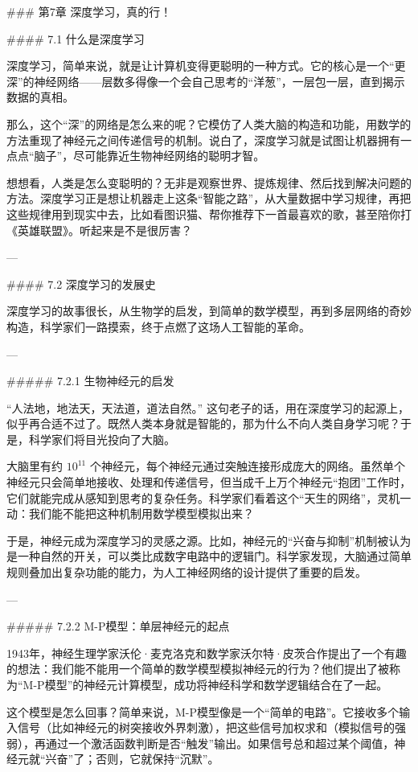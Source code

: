 ### 第7章 深度学习，真的行！

#### 7.1 什么是深度学习

深度学习，简单来说，就是让计算机变得更聪明的一种方式。它的核心是一个“更深”的神经网络——层数多得像一个会自己思考的“洋葱”，一层包一层，直到揭示数据的真相。

那么，这个“深”的网络是怎么来的呢？它模仿了人类大脑的构造和功能，用数学的方法重现了神经元之间传递信号的机制。说白了，深度学习就是试图让机器拥有一点点“脑子”，尽可能靠近生物神经网络的聪明才智。

想想看，人类是怎么变聪明的？无非是观察世界、提炼规律、然后找到解决问题的方法。深度学习正是想让机器走上这条“智能之路”，从大量数据中学习规律，再把这些规律用到现实中去，比如看图识猫、帮你推荐下一首最喜欢的歌，甚至陪你打《英雄联盟》。听起来是不是很厉害？

---

#### 7.2 深度学习的发展史

深度学习的故事很长，从生物学的启发，到简单的数学模型，再到多层网络的奇妙构造，科学家们一路摸索，终于点燃了这场人工智能的革命。

---

##### 7.2.1 生物神经元的启发

“人法地，地法天，天法道，道法自然。” 这句老子的话，用在深度学习的起源上，似乎再合适不过了。既然人类本身就是智能的，那为什么不向人类自身学习呢？于是，科学家们将目光投向了大脑。

大脑里有约 \(10^{11}\) 个神经元，每个神经元通过突触连接形成庞大的网络。虽然单个神经元只会简单地接收、处理和传递信号，但当成千上万个神经元“抱团”工作时，它们就能完成从感知到思考的复杂任务。科学家们看着这个“天生的网络”，灵机一动：我们能不能把这种机制用数学模型模拟出来？

于是，神经元成为深度学习的灵感之源。比如，神经元的“兴奋与抑制”机制被认为是一种自然的开关，可以类比成数字电路中的逻辑门。科学家发现，大脑通过简单规则叠加出复杂功能的能力，为人工神经网络的设计提供了重要的启发。

---

##### 7.2.2 M-P模型：单层神经元的起点

1943年，神经生理学家沃伦·麦克洛克和数学家沃尔特·皮茨合作提出了一个有趣的想法：我们能不能用一个简单的数学模型模拟神经元的行为？他们提出了被称为“M-P模型”的神经元计算模型，成功将神经科学和数学逻辑结合在了一起。

这个模型是怎么回事？简单来说，M-P模型像是一个“简单的电路”。它接收多个输入信号（比如神经元的树突接收外界刺激），把这些信号加权求和（模拟信号的强弱），再通过一个激活函数判断是否“触发”输出。如果信号总和超过某个阈值，神经元就“兴奋”了；否则，它就保持“沉默”。

